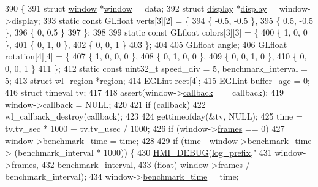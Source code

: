 \begin{DoxyCode}
390 \{
391     \textcolor{keyword}{struct }\hyperlink{structwindow}{window} *\hyperlink{structwindow}{window} = data;
392     \textcolor{keyword}{struct }\hyperlink{structdisplay}{display} *\hyperlink{structdisplay}{display} = window->\hyperlink{structwindow_a129486f2bd23791194f389ca1405cfd4}{display};
393     \textcolor{keyword}{static} \textcolor{keyword}{const} GLfloat verts[3][2] = \{
394         \{ -0.5, -0.5 \},
395         \{  0.5, -0.5 \},
396         \{  0,    0.5 \}
397     \};
398 
399     \textcolor{keyword}{static} \textcolor{keyword}{const} GLfloat colors[3][3] = \{
400         \{ 1, 0, 0 \},
401         \{ 0, 1, 0 \},
402         \{ 0, 0, 1 \}
403     \};
404 
405     GLfloat angle;
406     GLfloat rotation[4][4] = \{
407         \{ 1, 0, 0, 0 \},
408         \{ 0, 1, 0, 0 \},
409         \{ 0, 0, 1, 0 \},
410         \{ 0, 0, 0, 1 \}
411     \};
412     \textcolor{keyword}{static} \textcolor{keyword}{const} uint32\_t speed\_div = 5, benchmark\_interval = 5;
413     \textcolor{keyword}{struct }wl\_region *region;
414     EGLint rect[4];
415     EGLint buffer\_age = 0;
416     \textcolor{keyword}{struct }timeval tv;
417 
418     assert(window->\hyperlink{structwindow_a35ba639556fa19d9273dad0953a6807e}{callback} == callback);
419     window->\hyperlink{structwindow_a35ba639556fa19d9273dad0953a6807e}{callback} = NULL;
420 
421     \textcolor{keywordflow}{if} (callback)
422         wl\_callback\_destroy(callback);
423 
424     gettimeofday(&tv, NULL);
425     time = tv.tv\_sec * 1000 + tv.tv\_usec / 1000;
426     \textcolor{keywordflow}{if} (window->\hyperlink{structwindow_a633864bb495ec265bee220a5c70cc98f}{frames} == 0)
427         window->\hyperlink{structwindow_a72629bf021a361ad900504732a74cb68}{benchmark\_time} = time;
428 
429     \textcolor{keywordflow}{if} (time - window->\hyperlink{structwindow_a72629bf021a361ad900504732a74cb68}{benchmark\_time} > (benchmark\_interval * 1000)) \{
430         \hyperlink{include_2hmi-debug_8h_a0d26d8b8201011dade787236519711c0}{HMI\_DEBUG}(\hyperlink{simple-egl_8cpp_a894f18168fa25101d792262f59846938}{log\_prefix},\textcolor{stringliteral}{"%
431                window->\hyperlink{structwindow_a633864bb495ec265bee220a5c70cc98f}{frames},
432                benchmark\_interval,
433                (\textcolor{keywordtype}{float}) window->\hyperlink{structwindow_a633864bb495ec265bee220a5c70cc98f}{frames} / benchmark\_interval);
434         window->\hyperlink{structwindow_a72629bf021a361ad900504732a74cb68}{benchmark\_time} = time;
}
\end{DoxyCode}
